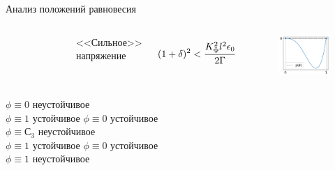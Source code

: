 \begin{frame}{Анализ положений равновесия}
\begin{columns}
\begin{figure}
	\end{figure}
	\begin{center}
		<<Сильное>> напряжение
	\end{center}
	\vspace{-0.2cm}
	$$(1 + \delta)^2 < \cfrac{K_\Phi^2 l^2 \epsilon_0}{2 \Gamma}$$
	\vspace{-0.7cm}
	\begin{figure}
		\includegraphics[width=\textwidth]{figures/equilibriums_case_3.png}
	\end{figure}
\end{columns}
\begin{columns}
	\hspace{0.5cm}
	$\phi \equiv 0$ неустойчивое \\
	\hspace{0.5cm}
	$\phi \equiv 1$ устойчивое
	\hspace{0.5cm}
	$\phi \equiv 0$ устойчивое \\
	\hspace{0.5cm}
	$\phi \equiv С_3$ неустойчивое \\
	\hspace{0.5cm}
	$\phi \equiv 1$ устойчивое
	\hspace{0.5cm}
	$\phi \equiv 0$ устойчивое \\
	\hspace{0.5cm}
	$\phi \equiv 1$ неустойчивое
\end{columns}
\end{frame}


